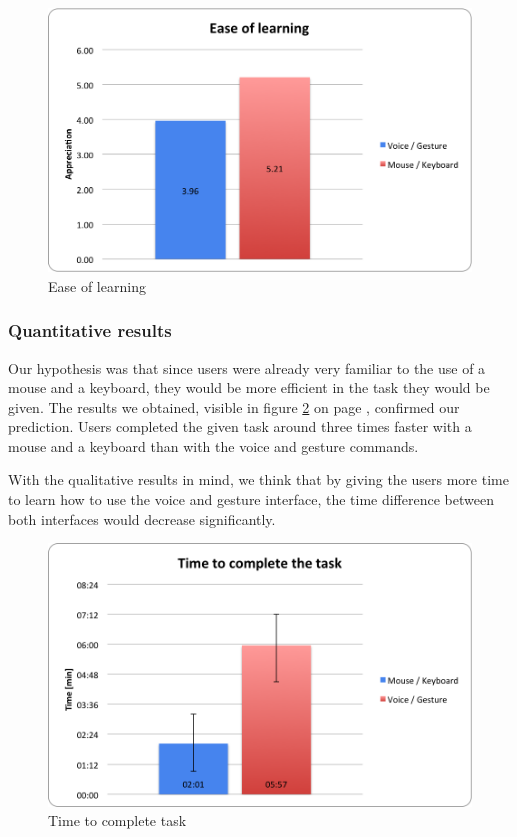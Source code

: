 \documentclass[a4paper, 10pt]{article}
\begin{document}
	\begin{figure}[h]
		\centering
			\includegraphics[scale=0.6]{graphs/ease_of_learning.png}
		\caption{Ease of learning}
		\label{fig:easeoflearning}
	\end{figure}
	
	\subsubsection{Quantitative results}	
	
	\par{Our hypothesis was that since users were already very familiar to the use of a mouse and a keyboard, they would be more efficient in the task they would be given. The results we obtained, visible in figure \ref{fig:completetask} on page \pageref{fig:completetask}, confirmed our prediction. Users completed the given task around three times faster with a mouse and a keyboard than with the voice and gesture commands.}
	\par{With the qualitative results in mind, we think that by giving the users more time to learn how to use the voice and gesture interface, the time difference between both interfaces would decrease significantly.}
	
	\begin{figure}[h]
		\centering
			\includegraphics[scale=0.6]{graphs/time_to_complete_task.png}
		\caption{Time to complete task}
		\label{fig:completetask}
	\end{figure}
	
\end{document}
